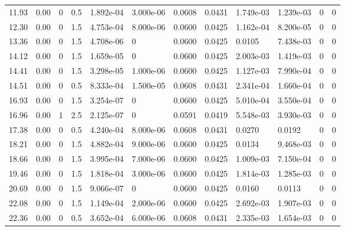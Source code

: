 \documentclass[preview]{standalone}
\begin{document}
{{\begin{tabular}{L{1.2cm}C{1.2cm} C{0.3cm}C{0.5cm} C{1.4cm}C{1.4cm} C{1.4cm}C{1.4cm} C{1.6cm}C{1.6cm} C{1.6cm}C{1.6cm}}
  11.93  &  0.00  & 0     & 0.5 &  1.892e-04  & 3.000e-06  &  0.0608&   0.0431& 1.749e-03 & 1.239e-03   &  0 & 0  \\ 
  12.30  &  0.00  & 0     & 1.5 &  4.753e-04  & 8.000e-06  &  0.0600&   0.0425& 1.162e-04 & 8.200e-05   &  0 & 0  \\ 
  13.36  &  0.00  & 0     & 1.5 &  4.708e-06  & 0  &  0.0600&   0.0425& 0.0105 & 7.438e-03   &  0 & 0  \\ 
  14.12  &  0.00  & 0     & 1.5 &  1.659e-05  & 0  &  0.0600&   0.0425& 2.003e-03 & 1.419e-03   &  0 & 0  \\ 
  14.41  &  0.00  & 0     & 1.5 &  3.298e-05  & 1.000e-06  &  0.0600&   0.0425& 1.127e-03 & 7.990e-04   &  0 & 0  \\ 
  14.51  &  0.00  & 0     & 0.5 &  8.333e-04  & 1.500e-05  &  0.0608&   0.0431& 2.341e-04 & 1.660e-04   &  0 & 0  \\ 
  16.93  &  0.00  & 0     & 1.5 &  3.254e-07  & 0  &  0.0600&   0.0425& 5.010e-04 & 3.550e-04   &  0 & 0  \\ 
  16.96  &  0.00  & 1     & 2.5 &  2.125e-07  & 0  &  0.0591&   0.0419& 5.548e-03 & 3.930e-03   &  0 & 0  \\ 
  17.38  &  0.00  & 0     & 0.5 &  4.240e-04  & 8.000e-06  &  0.0608&   0.0431& 0.0270 & 0.0192   &  0 & 0  \\ 
  18.21  &  0.00  & 0     & 1.5 &  4.882e-04  & 9.000e-06  &  0.0600&   0.0425& 0.0134 & 9.468e-03   &  0 & 0  \\ 
  18.66  &  0.00  & 0     & 1.5 &  3.995e-04  & 7.000e-06  &  0.0600&   0.0425& 1.009e-03 & 7.150e-04   &  0 & 0  \\ 
  19.46  &  0.00  & 0     & 1.5 &  1.818e-04  & 3.000e-06  &  0.0600&   0.0425& 1.814e-03 & 1.285e-03   &  0 & 0  \\ 
  20.69  &  0.00  & 0     & 1.5 &  9.066e-07  & 0  &  0.0600&   0.0425& 0.0160 & 0.0113   &  0 & 0  \\ 
  22.08  &  0.00  & 0     & 1.5 &  1.149e-04  & 2.000e-06  &  0.0600&   0.0425& 2.692e-03 & 1.907e-03   &  0 & 0  \\ 
  22.36  &  0.00  & 0     & 0.5 &  3.652e-04  & 6.000e-06  &  0.0608&   0.0431& 2.335e-03 & 1.654e-03   &  0 & 0  \\ 
\hline 
\end{tabular} 

}}
\end{document}
